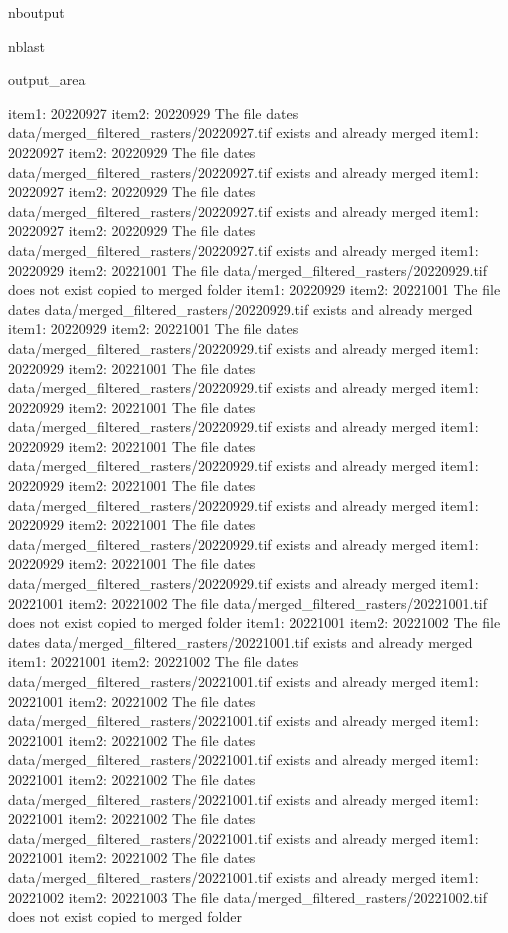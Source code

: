 \documentclass[letterpaper,10pt]{sphinxmanual}
\begin{document}
\begin{sphinxuseclass}{nboutput}
\begin{sphinxuseclass}{nblast}
{\begin{sphinxuseclass}{output_area}
\begin{sphinxuseclass}{}
\begin{sphinxVerbatim}[commandchars=\\\{\}]
item1:  20220927
item2:  20220929
The file dates data/merged\_filtered\_rasters/20220927.tif exists and already merged
item1:  20220927
item2:  20220929
The file dates data/merged\_filtered\_rasters/20220927.tif exists and already merged
item1:  20220927
item2:  20220929
The file dates data/merged\_filtered\_rasters/20220927.tif exists and already merged
item1:  20220927
item2:  20220929
The file dates data/merged\_filtered\_rasters/20220927.tif exists and already merged
item1:  20220929
item2:  20221001
The file data/merged\_filtered\_rasters/20220929.tif does not exist copied to merged folder
item1:  20220929
item2:  20221001
The file dates data/merged\_filtered\_rasters/20220929.tif exists and already merged
item1:  20220929
item2:  20221001
The file dates data/merged\_filtered\_rasters/20220929.tif exists and already merged
item1:  20220929
item2:  20221001
The file dates data/merged\_filtered\_rasters/20220929.tif exists and already merged
item1:  20220929
item2:  20221001
The file dates data/merged\_filtered\_rasters/20220929.tif exists and already merged
item1:  20220929
item2:  20221001
The file dates data/merged\_filtered\_rasters/20220929.tif exists and already merged
item1:  20220929
item2:  20221001
The file dates data/merged\_filtered\_rasters/20220929.tif exists and already merged
item1:  20220929
item2:  20221001
The file dates data/merged\_filtered\_rasters/20220929.tif exists and already merged
item1:  20220929
item2:  20221001
The file dates data/merged\_filtered\_rasters/20220929.tif exists and already merged
item1:  20221001
item2:  20221002
The file data/merged\_filtered\_rasters/20221001.tif does not exist copied to merged folder
item1:  20221001
item2:  20221002
The file dates data/merged\_filtered\_rasters/20221001.tif exists and already merged
item1:  20221001
item2:  20221002
The file dates data/merged\_filtered\_rasters/20221001.tif exists and already merged
item1:  20221001
item2:  20221002
The file dates data/merged\_filtered\_rasters/20221001.tif exists and already merged
item1:  20221001
item2:  20221002
The file dates data/merged\_filtered\_rasters/20221001.tif exists and already merged
item1:  20221001
item2:  20221002
The file dates data/merged\_filtered\_rasters/20221001.tif exists and already merged
item1:  20221001
item2:  20221002
The file dates data/merged\_filtered\_rasters/20221001.tif exists and already merged
item1:  20221001
item2:  20221002
The file dates data/merged\_filtered\_rasters/20221001.tif exists and already merged
item1:  20221002
item2:  20221003
The file data/merged\_filtered\_rasters/20221002.tif does not exist copied to merged folder

\end{sphinxVerbatim}
\end{sphinxuseclass}
\end{sphinxuseclass}}
\end{sphinxuseclass}
\end{sphinxuseclass}
\end{document}
